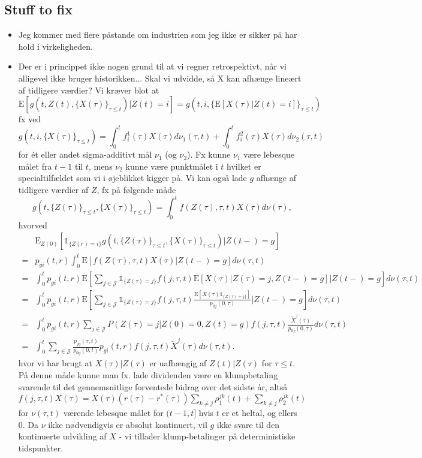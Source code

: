 \documentclass[12pt]{article}
\newcommand{\E}{\text{E}}
\newcommand{\indic}[1]{\mathds{1}_{ \{ #1 \} }}
\theoremstyle{my_thm}
\begin{document}
\subsection*{Stuff to fix}
\begin{itemize}
\item Jeg kommer med flere påstande om industrien som jeg ikke er sikker på har hold i virkeligheden.
\item Der er i princippet ikke nogen grund til at vi regner retrospektivt, når vi alligevel ikke bruger historikken... Skal vi udvidde, så X kan afhænge lineært af tidligere værdier? Vi kræver blot at
$$
\E[g(t,Z(t),\{ X(\tau) \}_{\tau\leq t})|Z(t)=i]=g(t,i,\{ \E[X(\tau)|Z(t)=i] \}_{\tau \leq t})$$
fx ved
$$
g(t,i,\{X(\tau)\}_{\tau \leq t})=\int_0^t f^1_i(\tau) X(\tau) d\nu_1(\tau,t) + \int_0^t f^2_i(\tau) X(\tau) d\nu_2(\tau,t)
$$
for ét eller andet sigma-additivt mål $\nu_1$ (og $\nu_2$). Fx kunne $\nu_1$ være lebesque målet fra $t-1$ til $t$, mens $\nu_2$ kunne være punktmålet i $t$ hvilket er specialtilfældet som vi i øjeblikket kigger på. Vi kan også lade $g$ afhænge af tidligere værdier af $Z$, fx på følgende måde
$$
g(t,\{Z(\tau)\}_{\tau\leq t},\{X(\tau)\}_{\tau\leq t})=
\int_0^t f(Z(\tau),\tau,t) X(\tau) d\nu(\tau),
$$
hvorved
\begin{align*}
&\E_{Z(0)}[\indic{Z(r)=i}g(t,\{Z(\tau)\}_{\tau\leq t},\{X(\tau)\}_{\tau\leq t})|Z(t-)=g]
\\
=&
p_{gi}(t,r)\int_0^t \E[ f(Z(\tau),\tau,t) X(\tau)|Z(t-)=g] d\nu(\tau,t)
\\
=&
\int_0^t p_{gi}(t,r) \E \left[ \sum_{j \in \mathcal{J}}  \indic{Z(\tau)=j} f(j,\tau,t) \E[X(\tau)|Z(\tau)=j,Z(t-)=g] \bigg| Z(t-)=g \right] d\nu(\tau,t)
\\
=&
\int_0^t p_{gi}(t,r) \E \left[ \sum_{j \in \mathcal{J}}  \indic{Z(\tau)=j} f(j,\tau,t) \frac{\E[X(\tau)\indic{Z(\tau)=j}]}{p_{0j}(0,\tau)} \bigg| Z(t-)=g \right] d\nu(\tau,t)
\\
=&
\int_0^t p_{gi}(t,r) \sum_{j \in \mathcal{J}}  P(Z(\tau)=j|Z(0)=0,Z(t)=g) f(j,\tau,t) \frac{\tilde{X}^j(\tau)}{p_{0j}(0,\tau)}  d\nu(\tau,t)
\\
=&
\int_0^t \sum_{j \in \mathcal{J}} \frac{p_{jg}(\tau,t)}{p_{0g}(0,t)} p_{gi}(t,r) f(j,\tau,t) \tilde{X}^j(\tau) d\nu(\tau,t).
\end{align*}
hvor vi har brugt at $X(\tau)|Z(\tau)$ er uafhængig af $Z(t)|Z(\tau)$ for $\tau\leq t$. På denne måde kunne man fx. lade dividenden være en klumpbetaling svarende til det gennemsnitlige forventede bidrag over det sidste år, altså $f(j,\tau,t)X(\tau)=X(\tau)(r(\tau)-r^*(\tau))\sum_{k\neq j} \rho_1^{jk}(t)+\sum_{k\neq j} \rho_2^{jk}(t)$ for $\nu(\tau,t)$ værende lebesque målet for $(t-1,t]$ hvis $t$ er et heltal, og ellers 0. Da $\nu$ ikke nødvendigvis er absolut kontinuert, vil $g$ ikke svare til den kontinuerte udvikling af $X$ - vi tillader klump-betalinger på deterministiske tidspunkter.

\end{itemize}
\end{document}
